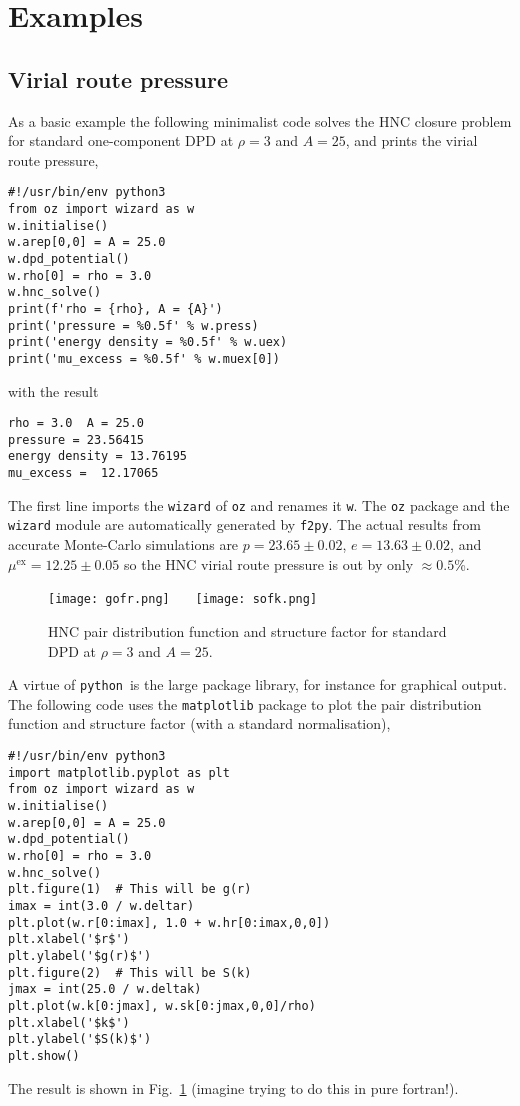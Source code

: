 \documentclass[12pt,a4paper]{article}
\newcommand{\FORTRAN}{{\sc fortran}}
\newcommand{\python}{{\tt python}}
\begin{document}
\section{Examples}
%
\subsection{Virial route pressure}
\label{sec:vrp}
%
As a basic example the following minimalist code solves the
HNC closure problem for standard one-component DPD at $\rho=3$ and
$A=25$, and prints the virial route pressure,
%
\begin{verbatim}
#!/usr/bin/env python3
from oz import wizard as w
w.initialise()
w.arep[0,0] = A = 25.0
w.dpd_potential()
w.rho[0] = rho = 3.0
w.hnc_solve()
print(f'rho = {rho}, A = {A}')
print('pressure = %0.5f' % w.press)
print('energy density = %0.5f' % w.uex)
print('mu_excess = %0.5f' % w.muex[0])
\end{verbatim}
%
with the result
%
\begin{verbatim}
rho = 3.0  A = 25.0
pressure = 23.56415
energy density = 13.76195
mu_excess =  12.17065
\end{verbatim}
%
The first line imports the \verb+wizard+ of \verb+oz+ and renames it
\verb+w+.  The \verb+oz+ package and the \verb+wizard+ module are
automatically generated by \verb+f2py+.  The actual results from
accurate Monte-Carlo simulations are $p=23.65\pm0.02$,
$e=13.63\pm0.02$, and $\mu^{\mathrm{ex}}=12.25\pm0.05$
so the HNC virial route pressure is out by only
$\approx0.5$\%.

\begin{figure}
\begin{center}
\texttt{[image: gofr.png]}~~~%
\texttt{[image: sofk.png]}
\end{center}
\caption{HNC pair distribution function and structure factor for
  standard DPD at $\rho=3$ and $A=25$.\label{fig:gs}}
\end{figure}

A virtue of \python\ is the large package library, for instance for
graphical output.  The following code uses the \verb+matplotlib+
package to plot the pair distribution function and structure factor
(with a standard normalisation),
%
\begin{verbatim}
#!/usr/bin/env python3
import matplotlib.pyplot as plt
from oz import wizard as w
w.initialise()
w.arep[0,0] = A = 25.0
w.dpd_potential()
w.rho[0] = rho = 3.0
w.hnc_solve()
plt.figure(1)  # This will be g(r)
imax = int(3.0 / w.deltar)
plt.plot(w.r[0:imax], 1.0 + w.hr[0:imax,0,0])
plt.xlabel('$r$')
plt.ylabel('$g(r)$')
plt.figure(2)  # This will be S(k)
jmax = int(25.0 / w.deltak)
plt.plot(w.k[0:jmax], w.sk[0:jmax,0,0]/rho)
plt.xlabel('$k$')
plt.ylabel('$S(k)$')
plt.show()
\end{verbatim}
%
The result is shown in Fig.~\ref{fig:gs} (imagine trying to do this in
pure \FORTRAN!).
\end{document}
